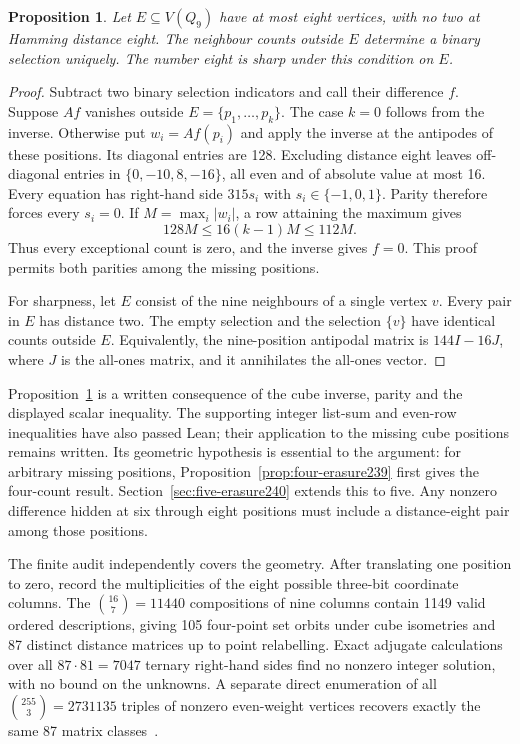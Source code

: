\documentclass[11pt,a4paper]{article}
\newtheorem{proposition}[theorem]{Proposition}
\theoremstyle{definition}
\theoremstyle{remark}
\begin{document}
\begin{proposition}\label{prop:eight-erasure239}
Let $E\subseteq V(Q_9)$ have at most eight vertices, with no two at
Hamming distance eight. The neighbour counts outside $E$ determine a
binary selection uniquely. The number eight is sharp under this
condition on $E$.
\end{proposition}
\begin{proof}
Subtract two binary selection indicators and call their difference
$f$. Suppose $Af$ vanishes outside $E=\{p_1,\ldots,p_k\}$.
The case $k=0$ follows from the inverse. Otherwise put $w_i=Af(p_i)$
and apply the inverse at the antipodes of these positions. Its diagonal
entries are 128. Excluding distance eight leaves off-diagonal entries
in $\{0,-10,8,-16\}$, all even and of absolute value at most 16.
Every equation has right-hand side $315s_i$ with
$s_i\in\{-1,0,1\}$. Parity therefore forces every $s_i=0$.
If $M=\max_i|w_i|$, a row attaining the maximum gives
\[
128M\le16(k-1)M\le112M.
\]
Thus every exceptional count is zero, and the inverse gives $f=0$.
This proof permits both parities among the missing positions.

For sharpness, let $E$ consist of the nine neighbours of a single
vertex $v$. Every pair in $E$ has distance two. The empty selection
and the selection $\{v\}$ have identical counts outside $E$.
Equivalently, the nine-position antipodal matrix is $144I-16J$,
where $J$ is the all-ones matrix, and it annihilates the all-ones vector.
\end{proof}

Proposition~\ref{prop:eight-erasure239} is a written consequence of the
cube inverse, parity and the displayed scalar inequality. The supporting
integer list-sum and even-row inequalities have also passed Lean; their
application to the missing cube positions remains written. Its geometric
hypothesis is essential to the argument: for arbitrary missing
positions, Proposition~\ref{prop:four-erasure239} first gives the
four-count result. Section~\ref{sec:five-erasure240} extends this to five.
Any nonzero difference hidden at six through eight positions must
include a distance-eight pair among those positions.

The finite audit independently covers the geometry. After translating
one position to zero, record the multiplicities of the eight possible
three-bit coordinate columns. The $\binom{16}{7}=11440$ compositions of
nine columns contain 1149 valid ordered descriptions, giving 105
four-point set orbits under cube isometries and 87 distinct distance
matrices up to point relabelling. Exact adjugate calculations over all
$87\cdot81=7047$ ternary right-hand sides find no nonzero integer
solution, with no bound on the unknowns. A separate direct enumeration
of all $\binom{255}{3}=2731135$ triples of nonzero even-weight vertices
recovers exactly the same 87 matrix classes~\cite{research239}.
\end{document}
